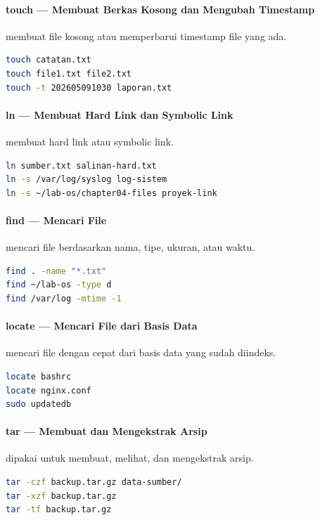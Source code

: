 \paragraph*{touch --- Membuat Berkas Kosong dan Mengubah Timestamp}
 membuat file kosong atau memperbarui timestamp file yang ada.
\begin{lstlisting}[language=bash]
touch catatan.txt
touch file1.txt file2.txt
touch -t 202605091030 laporan.txt
\end{lstlisting}

\paragraph*{ln --- Membuat Hard Link dan Symbolic Link}
 membuat hard link atau symbolic link.
\begin{lstlisting}[language=bash]
ln sumber.txt salinan-hard.txt
ln -s /var/log/syslog log-sistem
ln -s ~/lab-os/chapter04-files proyek-link
\end{lstlisting}

\paragraph*{find --- Mencari File}
 mencari file berdasarkan nama, tipe, ukuran, atau waktu.
\begin{lstlisting}[language=bash]
find . -name "*.txt"
find ~/lab-os -type d
find /var/log -mtime -1
\end{lstlisting}

\paragraph*{locate --- Mencari File dari Basis Data}
 mencari file dengan cepat dari basis data yang sudah diindeks.
\begin{lstlisting}[language=bash]
locate bashrc
locate nginx.conf
sudo updatedb
\end{lstlisting}

\paragraph*{tar --- Membuat dan Mengekstrak Arsip}
 dipakai untuk membuat, melihat, dan mengekstrak arsip.
\begin{lstlisting}[language=bash]
tar -czf backup.tar.gz data-sumber/
tar -xzf backup.tar.gz
tar -tf backup.tar.gz
\end{lstlisting}

